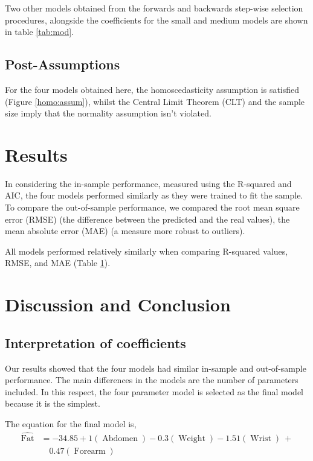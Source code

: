 \documentclass[letterpaper,9pt,twocolumn,twoside,]{pinp}
\begin{document}
Two other models obtained from the forwards and backwards step-wise
selection procedures, alongside the coefficients for the small and
medium models are shown in table \ref{tab:mod}.

\hypertarget{post-assumptions}{%
\subsection{Post-Assumptions}\label{post-assumptions}}

For the four models obtained here, the homoscedasticity assumption is
satisfied (Figure \ref{homo:assum}), whilst the Central Limit Theorem
(CLT) and the sample size imply that the normality assumption isn't
violated.

\hypertarget{results}{%
\section{Results}\label{results}}

In considering the in-sample performance, measured using the R-squared
and AIC, the four models performed similarly as they were trained to fit
the sample. To compare the out-of-sample performance, we compared the
root mean square error (RMSE) (the difference between the predicted and
the real values), the mean absolute error (MAE) (a measure more robust
to outliers).

All models performed relatively similarly when comparing R-squared
values, RMSE, and MAE (Table \ref{results}).

\hypertarget{discussion-and-conclusion}{%
\section{Discussion and Conclusion}\label{discussion-and-conclusion}}

\hypertarget{interpretation-of-coefficients}{%
\subsection{Interpretation of
coefficients}\label{interpretation-of-coefficients}}

Our results showed that the four models had similar in-sample and
out-of-sample performance. The main differences in the models are the
number of parameters included. In this respect, the four parameter model
is selected as the final model because it is the simplest.

The equation for the final model is, \[
\begin{aligned}
\operatorname{\widehat{Fat}} &= -34.85 + 1(\operatorname{Abdomen}) - 0.3(\operatorname{Weight}) - 1.51(\operatorname{Wrist})\ + \\
&\quad 0.47(\operatorname{Forearm})
\end{aligned}
\]
\end{document}
